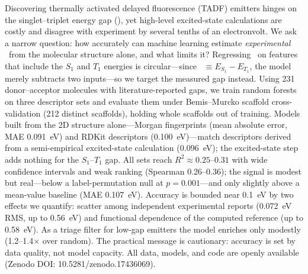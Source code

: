 
Discovering thermally activated delayed fluorescence (TADF) emitters hinges on the
singlet--triplet energy gap (\deltaest), yet high-level excited-state calculations are
costly and disagree with experiment by several tenths of an electronvolt.
%
We ask a narrow question: how accurately can machine learning estimate
\emph{experimental} \deltaest\ from the molecular structure alone, and what limits it?
%
Regressing \deltaest\ on features that include
the $S_1$ and $T_1$ energies is circular---since
\deltaest~$\equiv E_{S_1}-E_{T_1}$, the model merely subtracts two inputs---so we target
the measured gap instead.
%
Using \num{231} donor--acceptor molecules with literature-reported gaps, we train
random forests on three descriptor sets and evaluate them under Bemis--Murcko scaffold
cross-validation (\num{212} distinct scaffolds), holding whole scaffolds out of
training. Models built from the 2D structure alone---Morgan fingerprints
(mean absolute error, MAE \qty{0.091}{\electronvolt}) and RDKit descriptors
(\qty{0.100}{\electronvolt})---match
descriptors derived from a semi-empirical excited-state calculation
(\qty{0.096}{\electronvolt}); the excited-state step adds nothing for the
$S_1$--$T_1$ gap.
%
All sets reach $R^2 \approx 0.25$--$0.31$ with wide confidence intervals and weak ranking
(Spearman \numrange{0.26}{0.36}); the signal is modest but real---below a label-permutation
null at $p = 0.001$---and only slightly above a mean-value baseline
(MAE \qty{0.107}{\electronvolt}).
%
Accuracy is bounded near \qty{0.1}{\electronvolt} by two effects we quantify: scatter
among independent experimental reports (\qty{0.072}{\electronvolt} RMS, up to
\qty{0.56}{\electronvolt}) and functional dependence of the computed reference
(up to \qty{0.58}{\electronvolt}).
%
As a triage filter for low-gap emitters the model enriches only modestly
(\numrange{1.2}{1.4}$\times$ over random). The practical message is cautionary: accuracy is
set by data quality, not model capacity.
%
All data, models, and code are openly available (Zenodo DOI: 10.5281/zenodo.17436069).
